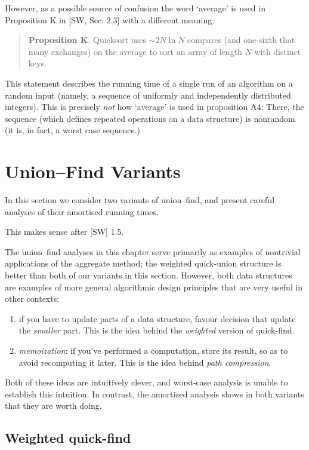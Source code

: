 \documentclass{tstextbook}
\begin{document}
However, as a possible source of confusion the word `average' is used in Proposition K in [SW, Sec. 2.3] with a different meaning:
\begin{quote}
  {\bf Proposition K}. Quicksort uses $\sim 2N\ln N$ compares (and one-sixth that many exchanges) on the average to sort an array of length $N$ with distinct keys.
\end{quote}
This statement describes the running time of a single run of an algorithm on a random input (namely, a sequence of uniformly and independently distributed integers).
This is precisely \emph{not} how `average' is used in proposition A4:
There, the sequence (which defines repeated operations on a data structure) is nonrandom (it is, in fact, a worst case sequence.)


\chapter{Union--Find Variants}

\begin{summary}
In this section we consider two variants of union--find, and present careful analyses of their amortised running times.

This makes sense after [SW] 1.5.
\end{summary}


The union--find analyses in this chapter serve primarily as examples of nontrivial applications of the aggregate method; the weighted quick-union structure is better than both of our variants in this section.
However, both data structures are examples of more general algorithmic design principles that are very useful in other contexts:
\begin{enumerate}
  \item if you have to update parts of a data structure, favour decision that update the \emph{smaller} part.
    This is the idea behind the \emph{weighted} version of quick-find.
  \item \emph{memoization}: if you've performed a computation, store its result, so as to avoid recomputing it later.
    This is the idea behind \emph{path compression}.
\end{enumerate}

Both of these ideas are intuitively clever, and worst-case analysis is unable to establish this intuition.
In contrast, the amortized analysis shows in both variants that they are worth doing.

\section{Weighted quick-find}
\end{document}
